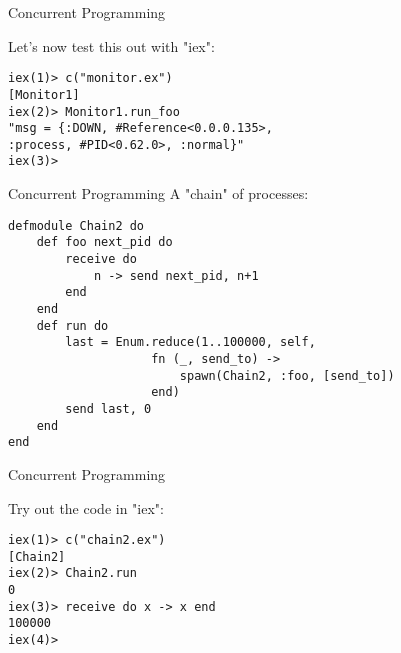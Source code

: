 \documentclass{beamer}
\begin{document}
\begin{frame}[fragile]{Concurrent Programming}

Let's now test this out with "iex":

\begin{verbatim}
iex(1)> c("monitor.ex")
[Monitor1]
iex(2)> Monitor1.run_foo
"msg = {:DOWN, #Reference<0.0.0.135>, 
:process, #PID<0.62.0>, :normal}"
iex(3)> 

\end{verbatim}

\end{frame}

\begin{frame}[fragile]{Concurrent Programming}
A "chain" of processes:

\begin{verbatim}
defmodule Chain2 do
    def foo next_pid do
        receive do
            n -> send next_pid, n+1
        end
    end
    def run do
        last = Enum.reduce(1..100000, self, 
                    fn (_, send_to) -> 
                        spawn(Chain2, :foo, [send_to]) 
                    end)
        send last, 0
    end
end
\end{verbatim}

\end{frame}
\begin{frame}[fragile]{Concurrent Programming}

Try out the code in "iex":

\begin{verbatim}
iex(1)> c("chain2.ex")
[Chain2]
iex(2)> Chain2.run
0
iex(3)> receive do x -> x end
100000
iex(4)>
\end{verbatim}

\end{frame}
\end{document}

